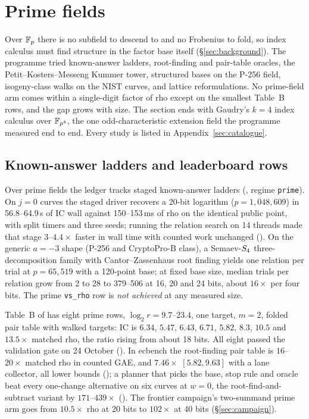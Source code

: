 \section{Prime fields}\label{sec:prime}

Over $\mathbb{F}_p$ there is no subfield to descend to and no Frobenius to fold,
so index calculus must find structure in the factor base itself
(\S\ref{sec:background}). The programme tried known-answer ladders,
root-finding and pair-table oracles, the Petit--Kosters--Messeng Kummer
tower, structured bases on the P-256 field, isogeny-class walks on the NIST
curves, and lattice reformulations. No prime-field arm comes within a
single-digit factor of rho except on the smallest Table~B rows, and the gap
grows with size. The section ends with Gaudry's $k=4$ index calculus over
$\mathbb{F}_{p^4}$, the one odd-characteristic extension field the programme
measured end to end. Every study is listed in Appendix~\ref{sec:catalogue}.

\subsection{Known-answer ladders and leaderboard rows}

Over prime fields the ledger tracks staged known-answer ladders
(, regime \texttt{prime}). On $j=0$
curves the staged driver recovers a 20-bit logarithm
($p=1{,}048{,}609$) in 56.8--64.9\,s of IC wall against 150--153\,ms of rho
on the identical public point, with split timers and three seeds; running
the relation search on 14 threads made that stage $3$--$4.4\times$ faster in
wall time with counted work unchanged
(). On the generic $a=-3$
shape (P-256 and CryptoPro-B class), a Semaev-$S_{4}$ three-decomposition
family with Cantor--Zassenhaus root finding yields one relation per trial at
$p=65{,}519$ with a 120-point base; at fixed base size, median trials per
relation grow from 2 to 28 to 379--506 at 16, 20 and 24 bits, about
$16\times$ per four bits. The prime \texttt{vs\_rho} row is \emph{not
achieved} at any measured size.

Table~B of  has eight prime rows,
$\log_2 r=9.7$--$23.4$, one target, $m=2$, folded pair table with walked
targets: IC is $6.34$, $5.47$, $6.43$, $6.71$, $5.82$, $8.3$, $10.5$ and
$13.5\times$ matched rho, the ratio rising from about 18 bits. All eight
passed the validation gate on 24 October
(). In ecbench the root-finding
pair table is $16$--$20\times$ matched rho in counted GAE, and $7.46\times$
$[5.82,9.63]$ with a lane collector, all lower bounds
(); a planner that picks
the base, stop rule and oracle beat every one-change alternative on six
curves at $w=0$, the root-find-and-subtract variant by $171$--$439\times$
(). The frontier campaign's
two-summand prime arm goes from $10.5\times$ rho at 20 bits to $102\times$ at
40 bits (\S\ref{sec:campaign}).

